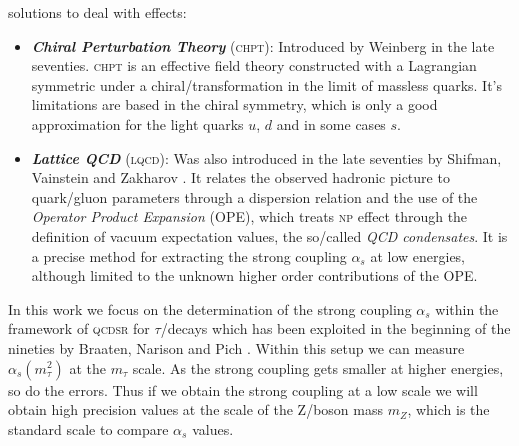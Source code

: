 \documentclass[../../index.tex]{subfiles}
\begin{document}
solutions to deal with  effects:
\begin{itemize}
\item \textbf{\textit{Chiral Perturbation Theory}}
  (\textsc{chpt}):
  Introduced by Weinberg \cite{Weinberg1978} in the late seventies.
  \textsc{chpt} is an effective field theory constructed with a Lagrangian
  symmetric under a chiral\-/transformation in the limit of massless quarks.
  It's limitations are based in the chiral symmetry, which is only a good
  approximation for the light quarks $u$, $d$ and in some cases $s$.
\item \textbf{\textit{Lattice QCD}}
  (\textsc{lqcd}): Was also introduced in the late seventies by Shifman, Vainstein
  and Zakharov \cite{Shifman1978,Shifman1978a}. It relates the observed hadronic
  picture to quark\-/gluon parameters through a dispersion relation and the use
  of the \textit{Operator Product Expansion} (OPE), which treats \textsc{np} effect
  through the definition of vacuum expectation values, the so\-/called
  \textit{QCD condensates}. It is a precise method for extracting the strong
  coupling $\alpha_s$ at low energies, although limited to the unknown higher
  order contributions of the OPE.
\end{itemize}


In this work we focus on the determination of the strong coupling $\alpha_s$
within the framework of \textsc{qcdsr} for $\tau$\-/decays which has been
exploited in the beginning of the nineties by Braaten, Narison and Pich
\cite{Braaten1991}. Within this setup we can measure $\alpha_s(m_\tau^2)$ at the
$m_\tau$ scale. As the strong coupling gets smaller at higher energies, so do
the errors. Thus if we obtain the strong coupling at a low scale we will obtain
high precision values at the scale of the Z\-/boson mass $m_Z$, which is the
standard scale to compare $\alpha_s$ values.
\end{document}
